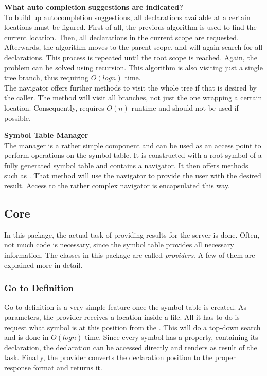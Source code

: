 \textbf{What auto completion suggestions are indicated?}\\
To build up autocompletion suggestions, all declarations available at a certain locations must be figured.
First of all, the previous  algorithm is used to find the current location.
Then, all declarations in the current scope are requested.
Afterwards, the algorithm moves to the parent scope, and will again search for all declarations.
This process is repeated until the root scope is reached.
Again, the problem can be solved using recursion.
This algorithm is also visiting just a single tree branch, thus requiring $O(logn)$ time.\\

The navigator offers further methods to visit the whole tree if that is desired by the caller.
The method  will visit all branches, not just the one wrapping a certain location.
Consequently,  requires $O(n)$ runtime and should not be used if possible.\\


\textbf{Symbol Table Manager}\\
The manager is a rather simple component and can be used as an access point to perform operations on the symbol table.
It is constructed with a root symbol of a fully generated symbol table and contains a navigator. 
It then offers methods such as .
That method will use the navigator to provide the user with the desired result.
Access to the rather complex navigator is encapsulated this way.

\subsection{Core}

In this package, the actual task of providing results for the server is done.
Often, not much code is necessary, since the symbol table provides all necessary information.
The classes in this package are called \textit{providers}.
A few of them are explained more in detail.\\

\subsubsection{Go to Definition}
Go to definition is a very simple feature once the symbol table is created.
As parameters, the provider receives a location inside a file.
All it has to do is request what symbol is at this position from the .
This will do a top-down search and is done in $O(logn)$ time.
Since every symbol has a property, containing its declaration, the declaration can be accessed directly and renders as result of the task.
Finally, the provider converts the declaration position to the proper response format and returns it.\\

